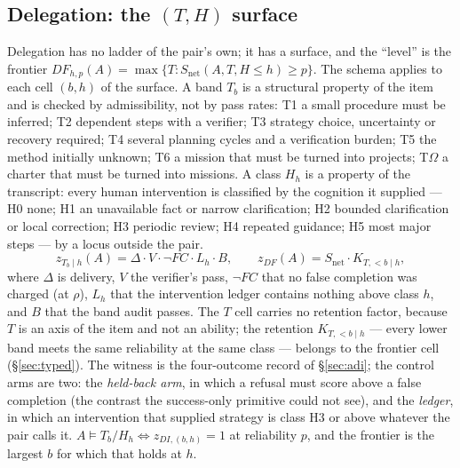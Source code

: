 \documentclass[11pt]{article}
\theoremstyle{definition}
\newcommand{\Om}{\ensuremath{\Omega}}
\begin{document}
\subsection{Delegation: the \texorpdfstring{$(T, H)$}{(T, H)} surface}
Delegation has no ladder of the pair's own; it has a surface, and the ``level'' is the frontier $DF_{h,p}(A) = \max\{T : S_{\mathrm{net}}(A, T, H \le h) \ge p\}$. The schema applies to each cell $(b, h)$ of the surface. A band $T_b$ is a structural property of the item and is checked by admissibility, not by pass rates: T1 a small procedure must be inferred; T2 dependent steps with a verifier; T3 strategy choice, uncertainty or recovery required; T4 several planning cycles and a verification burden; T5 the method initially unknown; T6 a mission that must be turned into projects; T\Om{} a charter that must be turned into missions. A class $H_h$ is a property of the transcript: every human intervention is classified by the cognition it supplied --- H0 none; H1 an unavailable fact or narrow clarification; H2 bounded clarification or local correction; H3 periodic review; H4 repeated guidance; H5 most major steps --- by a locus outside the pair.
\[
z_{T_b \mid h}(A) = \Delta \cdot V \cdot \neg FC \cdot L_h \cdot B, \qquad z_{DF}(A) = S_{\mathrm{net}} \cdot K_{T,<b \mid h},
\]
where $\Delta$ is delivery, $V$ the verifier's pass, $\neg FC$ that no false completion was charged (at $\rho$), $L_h$ that the intervention ledger contains nothing above class $h$, and $B$ that the band audit passes. The $T$ cell carries no retention factor, because $T$ is an axis of the item and not an ability; the retention $K_{T,<b\mid h}$ --- every lower band meets the same reliability at the same class --- belongs to the frontier cell (\S\ref{sec:typed}). The witness is the four-outcome record of \S\ref{sec:adi}; the control arms are two: the \emph{held-back arm}, in which a refusal must score above a false completion (the contrast the success-only primitive could not see), and the \emph{ledger}, in which an intervention that supplied strategy is class H3 or above whatever the pair calls it. $A \models T_b/H_h \iff z_{DI,(b,h)} = 1$ at reliability $p$, and the frontier is the largest $b$ for which that holds at $h$.
\end{document}
